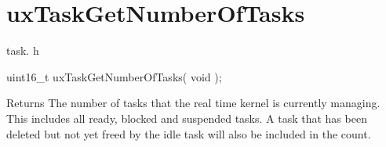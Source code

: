 \hypertarget{group__uxTaskGetNumberOfTasks}{}\section{ux\+Task\+Get\+Number\+Of\+Tasks}
\label{group__uxTaskGetNumberOfTasks}
task. h 
\begin{DoxyPre}uint16\_t uxTaskGetNumberOfTasks( void );\end{DoxyPre}


\begin{DoxyReturn}{Returns}
The number of tasks that the real time kernel is currently managing. This includes all ready, blocked and suspended tasks. A task that has been deleted but not yet freed by the idle task will also be included in the count. 
\end{DoxyReturn}
